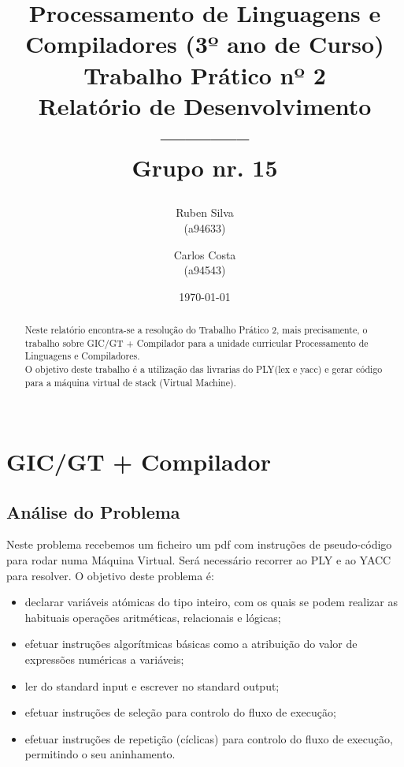 \documentclass[11pt,a4paper]{report}%
\title{Processamento de Linguagens e Compiladores (3º ano de Curso)\\
       \textbf{Trabalho Prático nº 2
}\\ Relatório de Desenvolvimento\\-----------
\\Grupo nr. 15

       } %
\author{Ruben Silva\\ (a94633) \and Carlos Costa\\ (a94543)
       } %
\date{\today} %
\begin{document}
\maketitle %

\begin{abstract}  %
Neste relatório encontra-se a resolução do Trabalho Prático 2, mais precisamente, o trabalho sobre GIC/GT + Compilador para a unidade curricular Processamento de Linguagens e Compiladores.\\
O objetivo deste trabalho é a utilização das livrarias do PLY(lex e yacc) e gerar código para a máquina virtual de stack (Virtual Machine).\\\
\end{abstract}

\tableofcontents %

\chapter{GIC/GT + Compilador} \label{chap:compiler} %

\section{Análise do Problema} \label{sec:analiseProb}

Neste problema recebemos um ficheiro um pdf com instruções de pseudo-código para rodar numa Máquina Virtual. Será necessário recorrer ao PLY e ao YACC para resolver.
O objetivo deste problema é:

\begin{itemize}
  \item declarar variáveis atómicas do tipo inteiro, com os quais se podem realizar as habituais operações aritméticas, relacionais e lógicas;
  \item efetuar instruções algorítmicas básicas como a atribuição do valor de expressões numéricas a variáveis;
  \item ler do standard input e escrever no standard output;
  \item efetuar instruções de seleção para controlo do fluxo de execução;
  \item efetuar instruções de repetição (cíclicas) para controlo do fluxo de execução, permitindo o seu aninhamento.

\end{itemize}
\end{document}

